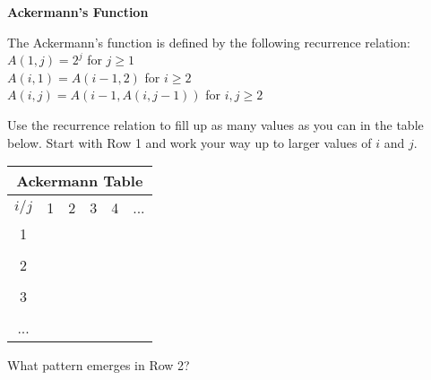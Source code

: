 \documentclass[12pt]{article}
\begin{document}
\newcommand{\I}{\mbox{{\em Int}}}
\newcommand{\lt}{\mbox{{\em left}}}
\newcommand{\rt}{\mbox{{\em right}}}
\newcommand{\ld}{\Delta^l}
\newcommand{\rd}{\Delta^r}
\newcommand{\lsp}[1]{\large\renewcommand{\baselinestretch}{#1}\normalsize}
\newcommand{\hsp}{\hspace{.2in}}

\def\Endwhile{\mbox{\bf endwhile\ }}
\def\Or{\mbox{\bf or\ }}
\def\Do{\mbox{\bf do\ }}
\def\Downto{\mbox{\bf downto\ }}
\def\Int{\mbox{\bf int\ }}
\def\To{\mbox{\bf to\ }}
\def\Repeat{\mbox{\bf repeat\ }}
\def\Until{\mbox{\bf until\ }}
\def\Return{\mbox{\bf return\ }}
\def\Not{\mbox{\bf not\ }}
\def\And{\mbox{\bf and\ }}
\def\For{\mbox{\bf for\ }}
\def\Foreach{\mbox{\bf foreach\ }}
\def\Else{\mbox{\bf else\ }}
\def\Elseif{\mbox{\bf elseif\ }}
\def\End{\mbox{\bf end\ }}
\def\If{\mbox{\bf if\ }}
\def\Mod{\mbox{\bf \ mod\ }}
\def\Then{\mbox{\bf then\ }}
\def\While{\mbox{\bf while\ }}
\def\Output{\mbox{\bf output\ }}


\lsp{1}
\pagestyle{plain}
\begin{center}
{\bf
Ackermann's Function
}
\end{center}

The Ackermann's function is defined by the following recurrence
relation:\\
$A(1,j) = 2^j$ for $j \ge 1$\\
$A(i,1) = A(i-1,2)$ for $i \ge 2$\\
$A(i,j) = A(i-1,A(i,j-1))$ for $i,j \ge 2$

\vspace*{0.5in}
Use the recurrence relation to fill up as many values as you can 
in the table below. Start with Row 1 and work your way up to 
larger values of $i$ and $j$.
\vspace*{0.5in}

\begin{tabular}{|c|c|c|c|c|c}\hline
\multicolumn{6}{|c}{Ackermann Table}\\\hline
$i/j$ & 1 \hspace*{0.5in} & 2 \hspace*{0.5in} & 3 \hspace*{0.5in} & 4 \hspace*{0.5in} & ... \\ \hline
1   &    &  &   &   &     \\
    &    &  &   &   &     \\  \hline
2   &    &  &   &   &     \\
    &    &  &   &   &     \\ \hline
3   &    &  &   &   &     \\
    &    &  &   &   &     \\ \hline
... &    &  &   &   &     \\
\end{tabular}

\vspace*{0.5in}
What pattern emerges in Row 2?
\end{document}
